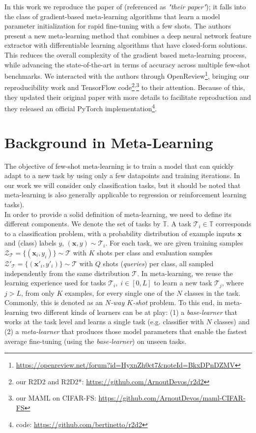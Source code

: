In this work we reproduce the paper of \citet{R2D2} (referenced as \textit{"their paper"}); it falls into the class of gradient-based meta-learning algorithms that learn a model parameter initialization for rapid fine-tuning with a few shots\supercite{finn,reptile}. The authors present a new meta-learning method that combines a deep neural network feature extractor with differentiable learning algorithms that have closed-form solutions. This reduces the overall complexity of the gradient based meta-learning process, while advancing the state-of-the-art in terms of accuracy across multiple few-shot benchmarks. We interacted with the authors through OpenReview\footnote{\url{https://openreview.net/forum?id=HyxnZh0ct7&noteId=BkxDPnDZMV}}, bringing our reproducibility work and TensorFlow code\footnote{our R2D2 and R2D2*: \url{https://github.com/ArnoutDevos/r2d2}}\textsuperscript{,}\footnote{our MAML on \textsc{CIFAR-FS}: \url{https://github.com/ArnoutDevos/maml-CIFAR-FS}} to their attention. Because of this, they updated their original paper with more details to facilitate reproduction and they released an official PyTorch implementation\footnote{\citet{R2D2} code: \url{https://github.com/bertinetto/r2d2}}.

\section{Background in Meta-Learning}
\label{related}
The objective of few-shot meta-learning is to train a model that can quickly adapt to a new task by using only a few datapoints and training iterations. In our work we will consider only classification tasks, but it should be noted that meta-learning is also generally applicable to regression or reinforcement learning tasks\supercite{finn}).\\

In order to provide a solid definition of meta-learning, we need to define its different components. We denote the set of tasks by $\mathbb{T}$. A task $\mathcal{T}_i \in \mathbb{T}$ corresponds to a classification problem, with a probability distribution of example inputs $\bm{x}$ and (class) labels $y$, $(\bm{x}, y) \sim\mathcal{T}_i$. For each task, we are given training samples $\mathcal{Z}_\mathcal{T}=\{ (\bm{x}_i,y_i) \} \sim \mathcal{T}$ with $K$ shots per class and evaluation samples $\mathcal{Z}'_\mathcal{T}=\{ (\bm{x}'_i,y'_i)\} \sim \mathcal{T}$ with $Q$ shots (\textit{queries}) per class, all sampled independently from the same distribution $\mathcal{T}$. In meta-learning, we reuse the learning experience used for tasks $\mathcal{T}_i, \; i\in [0, L]$ to learn a new task $\mathcal{T}_j$, where $j>L$, from only $K$ examples, for every single one of the $N$ classes in the task. Commonly, this is denoted as an \textit{$N$-way $K$-shot} problem. To this end, in meta-learning two different kinds of learners can be at play: (1) a \textit{base-learner} that works at the task level and learns a single task (e.g. classifier with $N$ classes) and (2) a \textit{meta-learner} that produces those model parameters that enable the fastest average fine-tuning (using the \textit{base-learner}) on unseen tasks.\\

